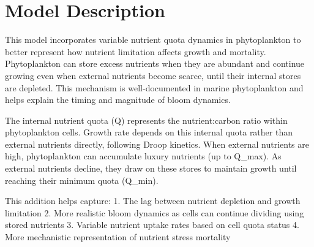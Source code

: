 \section{Model Description}

This model incorporates variable nutrient quota dynamics in phytoplankton to better represent how nutrient limitation affects growth and mortality. Phytoplankton can store excess nutrients when they are abundant and continue growing even when external nutrients become scarce, until their internal stores are depleted. This mechanism is well-documented in marine phytoplankton and helps explain the timing and magnitude of bloom dynamics.

The internal nutrient quota (Q) represents the nutrient:carbon ratio within phytoplankton cells. Growth rate depends on this internal quota rather than external nutrients directly, following Droop kinetics. When external nutrients are high, phytoplankton can accumulate luxury nutrients (up to Q_max). As external nutrients decline, they draw on these stores to maintain growth until reaching their minimum quota (Q_min).

This addition helps capture:
1. The lag between nutrient depletion and growth limitation
2. More realistic bloom dynamics as cells can continue dividing using stored nutrients
3. Variable nutrient uptake rates based on cell quota status
4. More mechanistic representation of nutrient stress mortality
